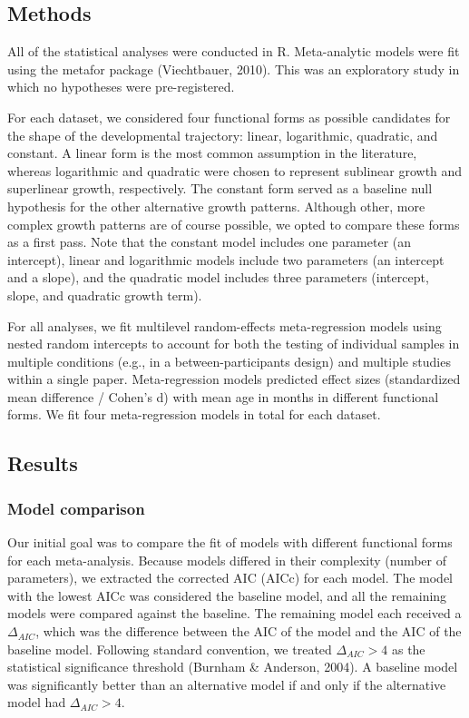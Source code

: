 \documentclass[
  man]{apa6}
\begin{document}
\hypertarget{methods}{%
\subsection{Methods}\label{methods}}

All of the statistical analyses were conducted in R. Meta-analytic models were fit using the metafor package (Viechtbauer, 2010). This was an exploratory study in which no hypotheses were pre-registered.

For each dataset, we considered four functional forms as possible candidates for the shape of the developmental trajectory: linear, logarithmic, quadratic, and constant. A linear form is the most common assumption in the literature, whereas logarithmic and quadratic were chosen to represent sublinear growth and superlinear growth, respectively. The constant form served as a baseline null hypothesis for the other alternative growth patterns. Although other, more complex growth patterns are of course possible, we opted to compare these forms as a first pass. Note that the constant model includes one parameter (an intercept), linear and logarithmic models include two parameters (an intercept and a slope), and the quadratic model includes three parameters (intercept, slope, and quadratic growth term).

For all analyses, we fit multilevel random-effects meta-regression models using nested random intercepts to account for both the testing of individual samples in multiple conditions (e.g., in a between-participants design) and multiple studies within a single paper. Meta-regression models predicted effect sizes (standardized mean difference / Cohen's d) with mean age in months in different functional forms. We fit four meta-regression models in total for each dataset.

\hypertarget{results}{%
\subsection{Results}\label{results}}

\hypertarget{model-comparison}{%
\subsubsection{Model comparison}\label{model-comparison}}

Our initial goal was to compare the fit of models with different functional forms for each meta-analysis. Because models differed in their complexity (number of parameters), we extracted the corrected AIC (AICc) for each model. The model with the lowest AICc was considered the baseline model, and all the remaining models were compared against the baseline. The remaining model each received a \(\Delta_{AIC}\), which was the difference between the AIC of the model and the AIC of the baseline model. Following standard convention, we treated \(\Delta_{AIC} > 4\) as the statistical significance threshold (Burnham \& Anderson, 2004). A baseline model was significantly better than an alternative model if and only if the alternative model had \(\Delta_{AIC} > 4\).
\end{document}
